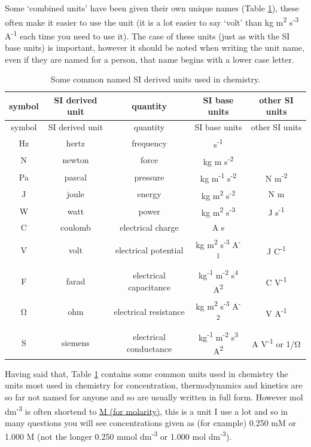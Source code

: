 \documentclass[
]{book}
\begin{document}
Some `combined units' have been given their own unique names (Table \ref{tab:SIderive}), these often make it easier to use the unit (it is a lot easier to say `volt' than kg m\textsuperscript{2} s\textsuperscript{-3} A\textsuperscript{-1} each time you need to use it). The case of these units (just as with the SI base units) is important, however it should be noted when writing the unit name, even if they are named for a person, that name begins with a lower case letter.

\begin{longtable}[]{@{}ccccc@{}}
\caption{\label{tab:SIderive} Some common named SI derived units used in chemistry.}\tabularnewline
\toprule
symbol & SI derived unit & quantity & SI base units & other SI units\tabularnewline
\midrule
\endfirsthead
\toprule
symbol & SI derived unit & quantity & SI base units & other SI units\tabularnewline
\midrule
\endhead
Hz & hertz & frequency & s\textsuperscript{-1} &\tabularnewline
N & newton & force & kg m s\textsuperscript{-2} &\tabularnewline
Pa & pascal & pressure & kg m\textsuperscript{-1} s\textsuperscript{-2} & N m\textsuperscript{-2}\tabularnewline
J & joule & energy & kg m\textsuperscript{2} s\textsuperscript{-2} & N m\tabularnewline
W & watt & power & kg m\textsuperscript{2} s\textsuperscript{-3} & J s\textsuperscript{-1}\tabularnewline
C & coulomb & electrical charge & A s &\tabularnewline
V & volt & electrical potential & kg m\textsuperscript{2} s\textsuperscript{-3} A\textsuperscript{-1} & J C\textsuperscript{-1}\tabularnewline
F & farad & electrical capacitance & kg\textsuperscript{-1} m\textsuperscript{-2} s\textsuperscript{4} A\textsuperscript{2} & C V\textsuperscript{-1}\tabularnewline
Ω & ohm & electrical resistance & kg m\textsuperscript{2} s\textsuperscript{-3} A\textsuperscript{-2} & V A\textsuperscript{-1}\tabularnewline
S & siemens & electrical conductance & kg\textsuperscript{-1} m\textsuperscript{-2} s\textsuperscript{3} A\textsuperscript{2} & A V\textsuperscript{-1} or 1/Ω\tabularnewline
\bottomrule
\end{longtable}

Having said that, Table \ref{tab:SIderive} contains some common units used in chemistry the units most used in chemistry for concentration, thermodynamics and kinetics are so far not named for anyone and so are usually written in full form. However mol dm\textsuperscript{-3} is often shortend to \href{https://goldbook.iupac.org/terms/view/A00295}{M (for molarity)}, this is a unit I use a lot and so in many questions you will see concentrations given as (for example) 0.250 mM or 1.000 M (not the longer 0.250 mmol dm\textsuperscript{-3} or 1.000 mol dm\textsuperscript{-3}).
\end{document}
